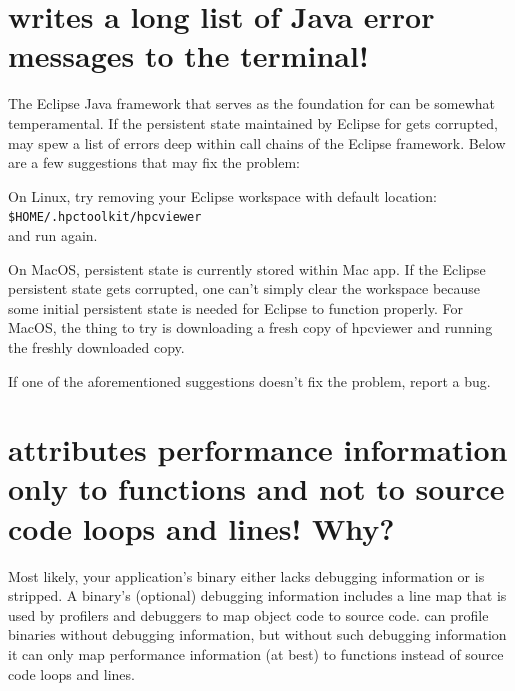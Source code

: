 \documentclass[11pt,letterpaper]{report}
\begin{document}


\section{\hpcviewer{} writes a long list of Java error messages to the terminal!}

The Eclipse Java framework that serves as the foundation for \hpcviewer{} can be somewhat temperamental. If the persistent state maintained by Eclipse for \hpcviewer{}
gets corrupted, \hpcviewer{} may spew a list of errors deep within call chains of the Eclipse framework.  Below are a few suggestions that may fix the problem:

On Linux, try removing your \hpcviewer{} Eclipse workspace with default location:\\
 \texttt{\$HOME/.hpctoolkit/hpcviewer} \\
 and run \hpcviewer{} again.  

On MacOS, persistent state is currently stored within Mac app. If the Eclipse persistent state gets corrupted, one can't simply clear the workspace because some initial persistent state is needed for Eclipse to function properly.  For MacOS, the thing to try is downloading a fresh copy of hpcviewer and running the freshly downloaded copy.

If one of the aforementioned suggestions doesn’t fix the problem, report a bug.


\section{\hpcviewer{} attributes performance information only to functions and not to source code loops and lines! Why?}
\label{sec:troubleshooting:debug-info}

Most likely, your application's binary either lacks debugging information or is stripped.
A binary's (optional) debugging information includes a line map that is used by profilers and debuggers to map object code to source code.
\HPCToolkit{} can profile binaries without debugging information, but without such debugging information it can only map performance information (at best) to functions instead of source code loops and lines.
\end{document}
